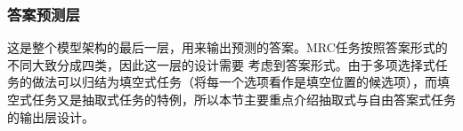 %

\subsubsection{答案预测层}
这是整个模型架构的最后一层，用来输出预测的答案。MRC任务按照答案形式的不同大致分成四类，因此这一层的设计需要
考虑到答案形式。由于多项选择式任务的做法可以归结为填空式任务（将每一个选项看作是填空位置的候选项），而填空式任务又是抽取式任务的特例，所以本节主要重点介绍抽取式与自由答案式任务的输出层设计。
%



